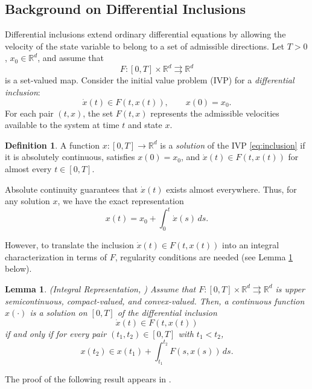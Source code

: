 \documentclass[11pt]{elsarticle}
\newtheorem{lemma}[theorem]{Lemma}
\theoremstyle{definition}
\newtheorem{definition}[theorem]{Definition}
\theoremstyle{remark}
\numberwithin{equation}{section}
\begin{document}
	
	\subsection{Background on Differential Inclusions} \label{sec:basicsDI}
	
	Differential inclusions extend ordinary differential equations by
	allowing the velocity of the state variable to belong to a set of
	admissible directions.  Let $T>0$, $x_0\in\mathbb{R}^d$, and assume that
	\[
	F:[0,T]\times\mathbb{R}^d\rightrightarrows\mathbb{R}^d
	\]
	is a set-valued map.  Consider the initial value problem (IVP) 
	for a \textit{differential} \textit{inclusion}:
	\begin{equation}\label{eq:inclusion}
		\dot{x}(t)\in F(t,x(t)),\qquad x(0)=x_0.
	\end{equation}
	For each pair $(t,x)$, the set $F(t,x)$ represents the admissible
	velocities available to the system at time $t$ and state $x$.
	
	\begin{definition}
		A function $x:[0,T]\to\mathbb{R}^d$ is a \emph{solution} of the IVP
		\eqref{eq:inclusion} if it is absolutely continuous, satisfies
		$x(0)=x_0$, and $\dot{x}(t)\in F(t,x(t))$ for almost every $t\in[0,T]$.
	\end{definition}
	
	Absolute continuity guarantees that $\dot{x}(t)$ 
	exists almost everywhere. Thus, for any solution $x$, we have 
	the exact representation
	\[
	x(t) = x_0 + \int_{0}^{t} \dot{x}(s) \, ds.
	\]
	
	
	However, to translate the inclusion $\dot{x}(t) \in F(t,x(t))$ into 
	an integral characterization in terms of $F$, regularity conditions 
	are needed (see Lemma \ref{lem:integral_repr} below).
	
	\begin{lemma}{\rm (Integral Representation, \cite[Lemma~1, p.\,99]{aubin_cellina_1984})} \label{lem:integral_repr}
		Assume that $F:[0,T] \times \mathbb{R}^d \rightrightarrows \mathbb{R}^d$ is upper semicontinuous, compact-valued, and convex-valued. Then, a continuous function 
		$x(\cdot)$ is a solution on $[0,T]$ of the differential inclusion
		\[
		\dot{x}(t) \in F(t, x(t))
		\]
		if and only if for every pair $(t_1, t_2)\in [0,T]$ with $t_1 < t_2$,
		\[
		x(t_2) \in x(t_1) + \int_{t_1}^{t_2} F(s, x(s)) \, ds.
		\]
	\end{lemma}
	
	The proof of the following result appears in
	\cite[Theorem~5.2, p.\,58]{deimling_1992}.
	
\end{document}
